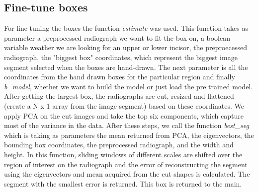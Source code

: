 \documentclass[a4paper]{article}
\begin{document}
\subsection{Fine-tune boxes}
For fine-tuning the boxes the function \textit{estimate} was used. This function takes as parameter a preprocessed radiograph we want to fit the box on, a boolean variable weather we are looking for an upper or lower incisor, the preproecessed radiograph, the "biggest box" coordinates, which represent the biggest image segment selected when the boxes are hand-drawn. The next parameter is all the coordinates from the hand drawn boxes for the particular region and finally \textit{b\_model}, whether we want to build the model or just load the pre trained model. After getting the largest box, the radiographs are cut, resized and flattened (create a N x 1 array from the image segment) based on these coordinates. We apply PCA on the cut images and take the top six components, which capture most of the variance in the data. After these steps, we call the function \textit{best\_seg} which is taking as parameters the mean returned from PCA, the eigenvectors, the bounding box coordinates, the preprocessed radiograph, and the width and height. In this function, sliding windows of different scales are shifted over the region of interest on the radiograph and the error of reconstructing the segment using the eigenvectors and mean acquired from the cut shapes is calculated. The segment with the smallest error is returned. This box is returned to the main.
\end{document}

